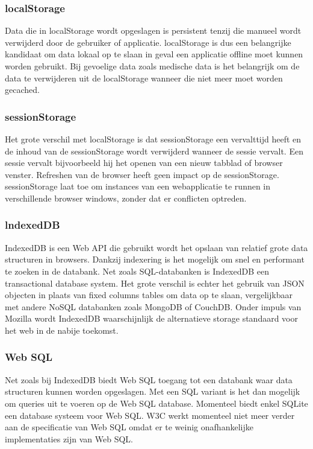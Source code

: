 \subsubsection{localStorage}
Data die in localStorage wordt opgeslagen is persistent tenzij die manueel wordt verwijderd door de gebruiker of applicatie. localStorage is dus een belangrijke kandidaat om data lokaal op te slaan in geval een applicatie offline moet kunnen worden gebruikt. Bij gevoelige data zoals medische data is het belangrijk om de data te verwijderen uit de localStorage wanneer die niet meer moet worden gecached.
\subsubsection{sessionStorage}
Het grote verschil met localStorage is dat sessionStorage een vervalttijd heeft en de inhoud van de sessionStorage wordt verwijderd wanneer de sessie vervalt. Een sessie vervalt bijvoorbeeld hij het openen van een nieuw tabblad of browser venster. Refreshen van de browser heeft geen impact op de sessionStorage. sessionStorage laat toe om instances van een webapplicatie te runnen in verschillende browser windows, zonder dat er conflicten optreden.
\subsubsection{lndexedDB}
IndexedDB is een Web API die gebruikt wordt het opslaan van relatief grote data structuren in browsers. Dankzij indexering is het mogelijk om snel en performant te zoeken in de databank. Net zoals SQL-databanken is IndexedDB een transactional database system. Het grote verschil is echter het gebruik van JSON objecten in plaats van fixed columns tables om data op te slaan, vergelijkbaar met andere NoSQL databanken zoals MongoDB of CouchDB. Onder impuls van Mozilla wordt IndexedDB waarschijnlijk de alternatieve storage standaard voor het web in de nabije toekomst.
\subsubsection{Web SQL}
Net zoals bij IndexedDB biedt Web SQL toegang tot een databank waar data structuren kunnen worden opgeslagen. Met een SQL variant is het dan mogelijk om queries uit te voeren op de Web SQL database. Momenteel biedt enkel SQLite een database systeem voor Web SQL. W3C werkt momenteel niet meer verder aan de specificatie van Web SQL omdat er te weinig onafhankelijke implementaties zijn van Web SQL. 
